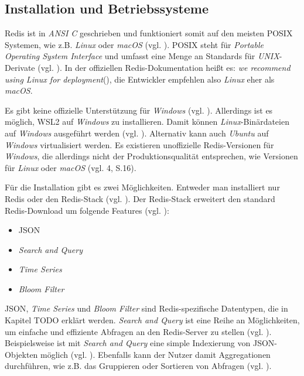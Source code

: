 
\subsection{Installation und Betriebssysteme}

\acs{Redis} ist in \textit{ANSI C} geschrieben und funktioniert somit auf den meisten \acs{POSIX} Systemen, wie z.B. \textit{Linux} oder \textit{macOS} (vgl. ). \acs{POSIX} steht für \textit{Portable Operating System Interface} und umfasst eine Menge an Standards für \textit{UNIX}-Derivate (vgl. ). In der offiziellen \ac{Redis}-Dokumentation heißt es: \glqq \textit{we recommend using Linux for deployment}\grqq (), die Entwickler empfehlen also \textit{Linux} eher als \textit{macOS}.

Es gibt keine offizielle Unterstützung für \textit{Windows} (vgl. ). Allerdings ist es möglich, \ac{WSL2} auf \textit{Windows} zu installieren. Damit können \textit{Linux}-Binärdateien auf \textit{Windows} ausgeführt werden (vgl. ). Alternativ kann auch \textit{Ubuntu} auf \textit{Windows} virtualisiert werden. Es existieren unoffizielle \ac{Redis}-Versionen für \textit{Windows}, die allerdings nicht der Produktionsqualität entsprechen, wie Versionen für \textit{Linux} oder \textit{macOS} (vgl. 4, S.16). 

Für die Installation gibt es zwei Möglichkeiten. Entweder man installiert nur \ac{Redis} oder den \ac{Redis}-Stack (vgl. ). Der \ac{Redis}-Stack erweitert den standard \ac{Redis}-Download um folgende Features (vgl. ):

\begin{itemize}
	\item \ac{JSON}
	\item \textit{Search and Query}
	\item \textit{Time Series}
	\item \textit{Bloom Filter}
\end{itemize}

\ac{JSON}, \textit{Time Series} und \textit{Bloom Filter} sind \ac{Redis}-spezifische Datentypen, die in Kapitel TODO erklärt werden. \textit{Search and Query} ist eine Reihe an Möglichkeiten, um einfache und effiziente Abfragen an den \ac{Redis}-Server zu stellen (vgl. ). Beispielsweise ist mit \textit{Search and Query} eine simple Indexierung von \ac{JSON}-Objekten möglich (vgl. ). Ebenfalls kann der Nutzer damit Aggregationen durchführen, wie z.B. das Gruppieren oder Sortieren von Abfragen (vgl. ).  

